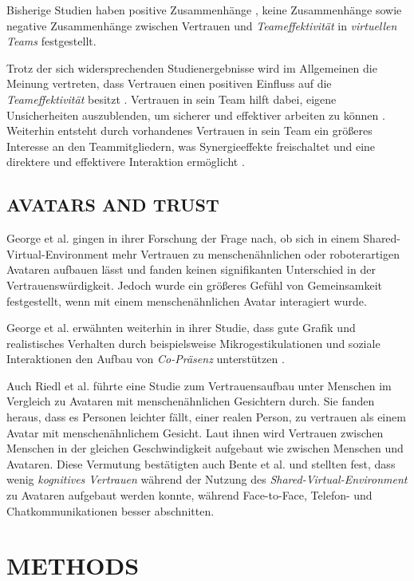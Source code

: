 \documentclass[sigchi]{acmart}
\begin{document}
Bisherige Studien haben positive Zusammenhänge \citep{davis2000trusted}, keine Zusammenhänge \citep{hertel2004managing} sowie negative Zusammenhänge \citep{dirks1999effects} zwischen Vertrauen und \textit{Teameffektivität} in \textit{virtuellen Teams} festgestellt.

Trotz der sich widersprechenden Studienergebnisse wird im Allgemeinen die Meinung vertreten, dass Vertrauen einen positiven Einfluss auf die \textit{Teameffektivität} besitzt \citep{de2016trust}. 
Vertrauen in sein Team hilft dabei, eigene Unsicherheiten auszublenden, um sicherer und effektiver arbeiten zu können \citep{de2010does}. Weiterhin entsteht durch vorhandenes Vertrauen in sein Team ein größeres Interesse an den Teammitgliedern, was Synergieeffekte freischaltet und eine direktere und effektivere Interaktion ermöglicht \citep{dirks1999effects}. 

\subsection{AVATARS AND TRUST}
George et al. \citep{george2018trusting} gingen in ihrer Forschung der Frage nach, ob sich in einem Shared-Virtual-Environment mehr Vertrauen zu menschenähnlichen oder roboterartigen Avataren aufbauen lässt und
fanden keinen signifikanten Unterschied in der Vertrauenswürdigkeit. Jedoch wurde ein größeres Gefühl von Gemeinsamkeit festgestellt, wenn mit einem menschenähnlichen Avatar interagiert wurde.

George et al. erwähnten weiterhin in ihrer Studie, dass gute Grafik und realistisches Verhalten durch beispielsweise Mikrogestikulationen und soziale Interaktionen den Aufbau von \textit{Co-Präsenz} unterstützen \citep{george2018trusting}.

Auch Riedl et al. \citep{riedl2014trusting} führte eine Studie zum Vertrauensaufbau unter Menschen im Vergleich zu Avataren mit menschenähnlichen Gesichtern durch. Sie fanden heraus, dass es Personen leichter fällt, einer realen Person, zu vertrauen als einem Avatar mit menschenähnlichem Gesicht. Laut ihnen wird Vertrauen zwischen Menschen in der gleichen Geschwindigkeit aufgebaut wie zwischen Menschen und Avataren.
Diese Vermutung bestätigten auch Bente et al. \citep[S. 54-59]{bente2004social} und stellten fest, dass wenig \textit{kognitives Vertrauen} während der Nutzung des \textit{Shared-Virtual-Environment} zu Avataren aufgebaut werden konnte, während Face-to-Face, Telefon- und Chatkommunikationen besser abschnitten.

\section{METHODS}
\end{document}
